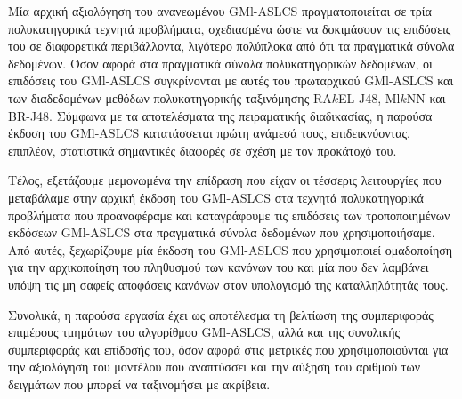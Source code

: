 Μία αρχική αξιολόγηση του ανανεωμένου GMl-ASLCS πραγματοποιείται σε τρία πολυκατηγορικά τεχνητά προβλήματα, σχεδιασμένα ώστε να δοκιμάσουν τις επιδόσεις του σε διαφορετικά περιβάλλοντα, λιγότερο πολύπλοκα από ότι τα πραγματικά σύνολα δεδομένων. Όσον αφορά στα πραγματικά σύνολα πολυκατηγορικών δεδομένων, οι επιδόσεις του GMl-ASLCS συγκρίνονται με αυτές του πρωταρχικού GMl-ASLCS και των διαδεδομένων μεθόδων πολυκατηγορικής ταξινόμησης RA$k$EL-J48, Ml$k$NN και BR-J48. Σύμφωνα με τα αποτελέσματα της πειραματικής διαδικασίας, η παρούσα έκδοση του GMl-ASLCS κατατάσσεται πρώτη ανάμεσά τους, επιδεικνύοντας, επιπλέον, στατιστικά σημαντικές διαφορές σε σχέση με τον προκάτοχό του.

Τέλος, εξετάζουμε μεμονωμένα την επίδραση που είχαν οι τέσσερις λειτουργίες που μεταβάλαμε στην αρχική έκδοση του GMl-ASLCS στα τεχνητά πολυκατηγορικά προβλήματα που προαναφέραμε και καταγράφουμε τις επιδόσεις των τροποποιημένων εκδόσεων GMl-ASLCS στα πραγματικά σύνολα δεδομένων που χρησιμοποιήσαμε. Από αυτές, ξεχωρίζουμε μία έκδοση του GMl-ASLCS που χρησιμοποιεί ομαδοποίηση για την αρχικοποίηση του πληθυσμού των κανόνων του και μία που δεν λαμβάνει υπόψη τις μη σαφείς αποφάσεις κανόνων στον υπολογισμό της καταλληλότητάς τους.

Συνολικά, η παρούσα εργασία έχει ως αποτέλεσμα τη βελτίωση της συμπεριφοράς επιμέρους τμημάτων του αλγορίθμου GMl-ASLCS, αλλά και της συνολικής συμπεριφοράς και επίδοσής του, όσον αφορά στις μετρικές που χρησιμοποιούνται για την αξιολόγηση του μοντέλου που αναπτύσσει και την αύξηση του αριθμού των δειγμάτων που μπορεί να ταξινομήσει με ακρίβεια.
